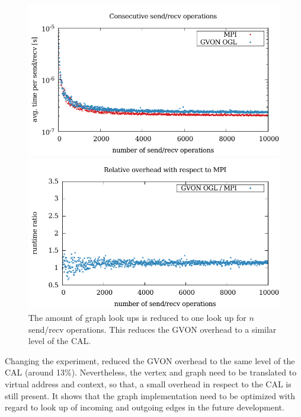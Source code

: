 \begin{figure}[H]
  \begin{minipage}[t]{0.5\textwidth} 
    \includegraphics[width=\textwidth]{plots/50_nsend_one_lookup_kepler}
  \end{minipage}%
  \begin{minipage}[t]{0.5\textwidth}
    \includegraphics[width=\textwidth]{plots/50_nsend_one_lookup_overhead_gvon_kepler}
  \end{minipage}%
  \caption{The amount of graph look ups is reduced to one look up for
    $n$ send/recv operations.  This reduces the GVON overhead to
    a similar level of the CAL.}
  \label{fig:nsend_one_lookup_kepler}
\end{figure}


\noindent Changing the experiment, reduced the GVON overhead to the
same level of the CAL (around 13\%). Nevertheless, the vertex and
graph need to be translated to virtual address and context, so that, a
small overhead in respect to the CAL is still present. It shows that
the graph implementation need to be optimized with regard to look up
of incoming and outgoing edges in the future development.

